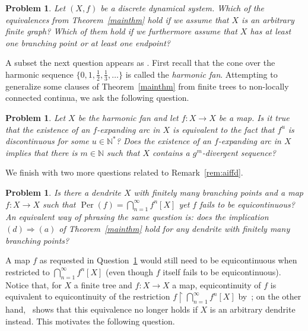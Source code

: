 \documentclass[12pt]{amsart}
\newtheorem{problem}[theorem]{Problem}
\theoremstyle{definition}
\numberwithin{equation}{section}
\DeclareMathOperator{\per}{Per}
\begin{document}
\begin{problem}
Let $(X,f)$ be a discrete dynamical system. Which of the equivalences from \emph{Theorem~\ref{mainthm}} hold 
if we assume that $X$ is an arbitrary finite graph? Which of them hold if we furthermore assume that $X$ has at 
least one branching point or at least one endpoint?
\end{problem}

A subset the next question appears as \cite[Question~3.9]{ivon-salvador}. First recall that
the cone over the harmonic sequence $\{0,1,\frac{1}{2},\frac{1}{3},\ldots\}$ is called the
\emph{harmonic fan}. Attempting to generalize some clauses of Theorem~\ref{mainthm} from finite trees
to non-locally connected continua, we ask the following question.

\begin{problem}
Let $X$ be the harmonic fan and let $f \colon X\longrightarrow X$ be a map. Is it true that
the existence of an $f$-expanding arc in $X$ is equivalent to the fact that $f^u$ is discontinuous for some $u \in 
\mathbb N^*$? Does the existence of an $f$-expanding arc in $X$ implies that there is $m \in \mathbb N$ such that
$X$ contains a $g^m$-divergent sequence?
\end{problem}

We finish with two more questions related to Remark~\ref{rem:aiffd}.

\begin{problem}\label{question:aiffd}
Is there a dendrite $X$ with finitely many branching points and a map $f:X\longrightarrow X$ such that $\per(f)=\bigcap_{n=1}^\infty f^n[X]$ yet $f$ fails to be equicontinuous? An equivalent way of phrasing the same question is: does the implication $(d)\Rightarrow(a)$ of \emph{Theorem~\ref{mainthm}} hold for any dendrite with finitely many branching points?
\end{problem}

A map $f$ as requested in Question~\ref{question:aiffd} would still need to be equicontinuous when restricted to $\bigcap_{n=1}^\infty f^n[X]$ (even though $f$ itself fails to be equicontinuous). Notice that, for $X$ a finite tree and $f:X\longrightarrow X$ a map, equicontinuity of $f$ is equivalent to equicontinuity of the restriction $f\upharpoonright\bigcap_{n=1}^\infty f^n[X]$ by~\cite[Theorem~5.2]{mai}; on the other hand,~\cite[Example 2.9]{sun2014} shows that this equivalence no longer holds if $X$ is an arbitrary dendrite instead. This motivates the following question.
\end{document}
